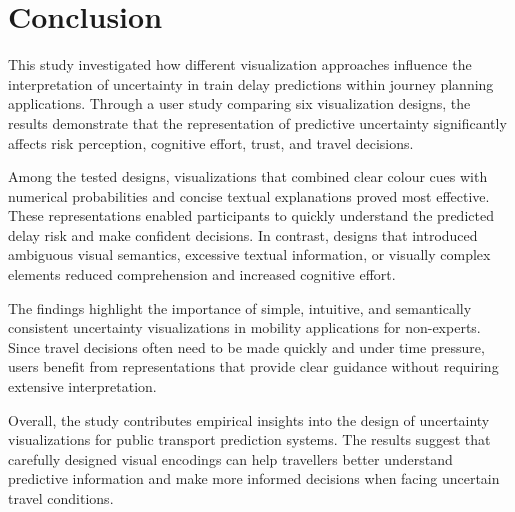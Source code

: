 \documentclass[final,journal,a4paper]{IEEEtran}
\begin{document}
\section{Conclusion} \label{Conclusion}
This study investigated how different visualization approaches influence the interpretation of uncertainty in train delay predictions within journey planning applications. Through a user study comparing six visualization designs, the results demonstrate that the representation of predictive uncertainty significantly affects risk perception, cognitive effort, trust, and travel decisions.

Among the tested designs, visualizations that combined clear colour cues with numerical probabilities and concise textual explanations proved most effective. These representations enabled participants to quickly understand the predicted delay risk and make confident decisions. In contrast, designs that introduced ambiguous visual semantics, excessive textual information, or visually complex elements reduced comprehension and increased cognitive effort.

The findings highlight the importance of simple, intuitive, and semantically consistent uncertainty visualizations in mobility applications for non-experts. Since travel decisions often need to be made quickly and under time pressure, users benefit from representations that provide clear guidance without requiring extensive interpretation.

Overall, the study contributes empirical insights into the design of uncertainty visualizations for public transport prediction systems. The results suggest that carefully designed visual encodings can help travellers better understand predictive information and make more informed decisions when facing uncertain travel conditions.



\end{document}
